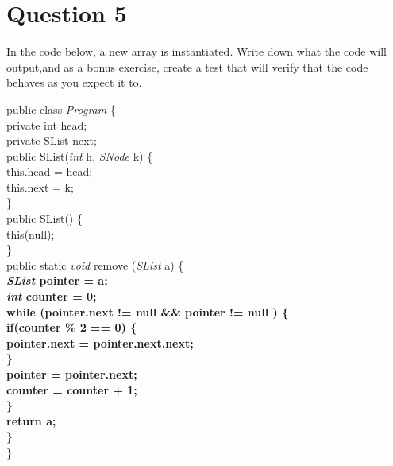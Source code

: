 \documentclass[11 pt, oneside]{article}
\begin{document}
\section{Question 5}
In the code below, a new array is instantiated. Write down what the code will output,and as a bonus exercise, create a test that will verify that the code behaves as you expect it to.
\begin{flushleft}
public class \textit{Program} \{\\
\setlength\parindent{12pt}
private int head;\\
private SList next;\\
\vspace{3mm}
public SList(\textit{int} h, \textit{SNode} k) \{\\
\setlength\parindent{24pt}
this.head = head;\\
this.next = k;\\
\setlength\parindent{12pt}
\}\\
\vspace{3mm}
public SList() \{\\
\setlength\parindent{24pt}
this(null); \\
\setlength\parindent{12pt}
\}\\
\vspace{3mm}
public static \textit{void} remove (\textit{SList} a) \{\\
\setlength\parindent{24pt}
\textbf{\textit{SList} pointer =  a;\\
\textit{int} counter = 0;\\
while (pointer.next != null \&\& pointer != null ) \{\\
\setlength\parindent{32pt}
if(counter \% 2 == 0) \{\\
\setlength\parindent{48pt}
pointer.next = pointer.next.next;\\
\setlength\parindent{32pt}
\}\\
pointer = pointer.next;\\
counter = counter + 1;\\
\setlength\parindent{24pt}
\}\\
return a;\\
\setlength\parindent{12pt}
\}\\
}
\setlength\parindent{0pt}
\}\\
\end{flushleft}
\clearpage
\end{document}
